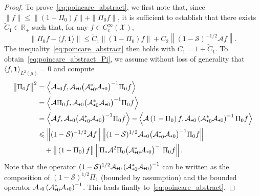 \documentclass[AHL,Unicode,longabstracts,MathTools,published]{cedram}
\newcommand{\rmc}{\mathrm{c}}
\newcommand{\cLs}{\mathcal{S}}
\newcommand{\cLa}{\mathcal{A}}
\newcommand{\cX}{\mathcal{X}}
\newcommand{\R}{\mathbb{R}}
\newcommand{\bfun}{\mathbf{1}}
\newcommand{\subplus}{\textnormal{\texttt{+}}}
\renewcommand{\leq}{\leqslant}
\begin{document}
\begin{proof}
To prove~\eqref{eq:poincare_abstract}, we first note that, since $\| f \| \leq \| (1-\Pi_0)f \| + \| \Pi_0 f \|$, it is sufficient to establish that there exists $\widetilde{C}_1 \in \R_+$ such that, for any $f \in C_\rmc^\infty(\cX)$,
\begin{equation}\label{eq:poincare_abstract_Pi}
\big\| \Pi_0 f - \langle f,\bfun\rangle \big\| \leq \widetilde{C}_1 \big\| \left(1-\Pi_0\right)f \big\| + C_2 \left\| (1-\cLs)^{-1/2} \cLa f \right\|.
\end{equation}
The inequality~\eqref{eq:poincare_abstract} then holds with $C_1 = 1 + \widetilde{C}_1$. To obtain~\eqref{eq:poincare_abstract_Pi}, we assume without loss of generality that $\langle f,\bfun\rangle_{L^2(\mu)} = 0$ and compute
\begin{align*}
\big\| \Pi_0 f \big\|^2 & = \left\langle \cLa_{\subplus 0} f, \cLa_{\subplus 0} \big(\cLa_{\subplus 0}^* \cLa_{\subplus 0}\big)^{-1} \Pi_0 f \right\rangle \\
& = \left\langle \cLa \Pi_0 f, \cLa_{\subplus 0} \big(\cLa_{\subplus 0}^* \cLa_{\subplus 0}\big)^{-1} \Pi_0 f \right\rangle \\
& = \left\langle \cLa f, \cLa_{\subplus 0} \big(\cLa_{\subplus 0}^* \cLa_{\subplus 0}\big)^{-1} \Pi_0 f \right\rangle - \left\langle \cLa \left(1-\Pi_0\right) f, \cLa_{\subplus 0} \left(\cLa_{\subplus 0}^* \cLa_{\subplus 0}\right)^{-1} \Pi_0 f \right\rangle \\
& \leq \left\|(1-\cLs)^{-1/2}\cLa f\right\| \left\|(1-\cLs)^{1/2} \cLa_{\subplus 0} \big(\cLa_{\subplus 0}^* \cLa_{\subplus 0}\big)^{-1} \Pi_0 f \right\| \\
& \quad + \big\|\left(1-\Pi_0\right)f\big\| \left\| \Pi_\subplus \cLa^2 \Pi_0 \big(\cLa_{\subplus 0}^* \cLa_{\subplus 0}\big)^{-1} \Pi_0 f \right\|.
\end{align*}
Note that the operator $(1-\cLs)^{1/2} \cLa_{\subplus 0} \left(\cLa_{\subplus 0}^* \cLa_{\subplus 0}\right)^{-1}$ can be written as the composition of $(1-\cLs)^{1/2} \Pi_1$ (bounded by assumption) and the bounded operator $\cLa_{\subplus 0} \left(\cLa_{\subplus 0}^* \cLa_{\subplus 0}\right)^{-1}$. This leads finally to~\eqref{eq:poincare_abstract}.
\end{proof}
\end{document}
